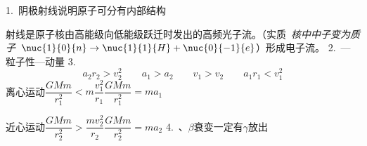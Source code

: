 1.\ 阴极射线说明原子可分有内部结构

\unclear{$\gamma$}射线是原子核由高能级向低能级跃迁时发出的高频光子流。（实质\ \textit{核中中子变为质子}\ $\nuc{1}{0}{n}\to\nuc{1}{1}{H}+\nuc{0}{-1}{e}$）形成电子流。 %
2.\ —粒子性—动量
3.
\[
a_2r_2>v_2^2\qquad a_1>a_2\qquad v_1>v_2\qquad a_1r_1<v_1^2
\]
离心运动\quad $\dfrac{GMm}{r_1^2}<m\dfrac{v_1^2}{r_1}$\quad $\dfrac{GMm}{r_1^2}=ma_1$

近心运动\quad $\dfrac{GMm}{r_2^2}>\dfrac{mv_2^2}{r_2}$\quad $\dfrac{GMm}{r_2^2}=ma_2$
4.\ \unclear{$\alpha$}、$\beta$衰变一定有$\gamma$放出

